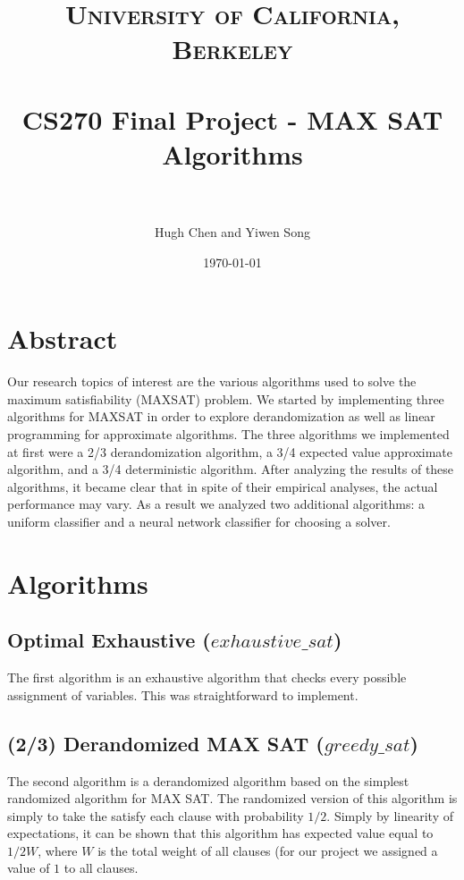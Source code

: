 \documentclass[paper=a4, fontsize=11pt]{scrartcl} %
\title{	
\normalfont \normalsize 
\textsc{University of California, Berkeley} \\ [25pt] %
\horrule{0.5pt} \\[0.4cm] %
\huge CS270 Final Project - MAX SAT Algorithms \\ %
\horrule{2pt} \\[0.5cm] %
}
\author{Hugh Chen and Yiwen Song} %
\date{\normalsize\today} %
\numberwithin{equation}{section} %
\numberwithin{figure}{section} %
\numberwithin{table}{section} %
\begin{document}
\maketitle %


\section{Abstract}

Our research topics of interest are the various algorithms used to solve the maximum satisfiability (MAXSAT) problem.  We started by implementing three algorithms for MAXSAT in order to explore derandomization as well as linear programming for approximate algorithms.  The three algorithms we implemented at first were a 2/3 derandomization algorithm, a 3/4 expected value approximate algorithm, and a 3/4 deterministic algorithm.  After analyzing the results of these algorithms, it became clear that in spite of their empirical analyses, the actual performance may vary.  As a result we analyzed two additional algorithms: a uniform classifier and a neural network classifier for choosing a solver.


\section{Algorithms}

\subsection{Optimal Exhaustive ($exhaustive\_sat$)}

The first algorithm is an exhaustive algorithm that checks every possible assignment of variables.  This was straightforward to implement.  

\subsection{(2/3) Derandomized MAX SAT ($greedy\_sat$)}

The second algorithm is a derandomized algorithm based on the simplest randomized algorithm for MAX SAT.  The randomized version of this algorithm is simply to take the satisfy each clause with probability $1/2$.  Simply by linearity of expectations, it can be shown that this algorithm has expected value equal to $1/2W$, where $W$ is the total weight of all clauses (for our project we assigned a value of $1$ to all clauses.  
\end{document}
